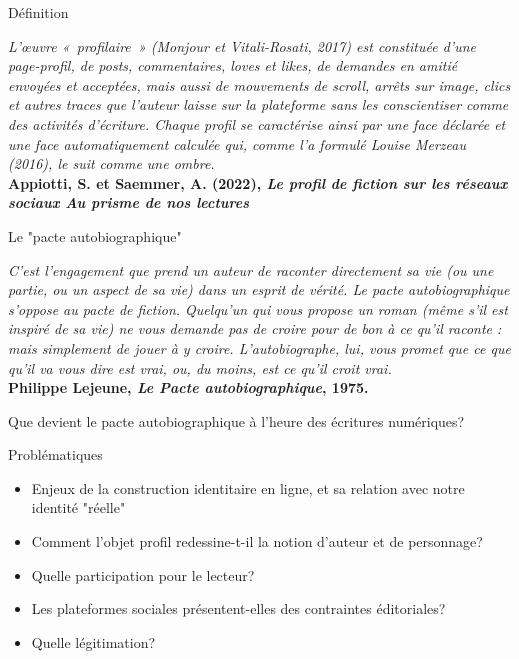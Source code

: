 \begin{frame}{Définition}

    \begin{center}
        {\small  \textit{L’œuvre « profilaire » (Monjour et Vitali-Rosati, 2017) est constituée d’une page-profil, de \textit{posts}, commentaires, \textit{loves} et \textit{likes}, de demandes en amitié envoyées et acceptées, mais aussi de mouvements de \textit{scroll}, arrêts sur image, clics et autres traces que l’auteur laisse sur la plateforme sans les conscientiser comme des activités d’écriture. Chaque profil se caractérise ainsi par une face déclarée et une face automatiquement calculée qui, comme l’a formulé Louise Merzeau (2016), le suit comme une ombre.}}\\
        \textbf{Appiotti, S. et Saemmer, A. (2022), \textit{Le profil de fiction sur les réseaux sociaux Au prisme de nos lectures}}
    \end{center}
\end{frame}

\begin{frame}{Le "pacte autobiographique"}
    \begin{center}
        {\small \textit{C'est l'engagement que prend un auteur de raconter directement sa vie (ou une partie, ou un aspect de sa vie) dans un esprit de vérité. Le pacte autobiographique s'oppose au pacte de fiction. Quelqu'un qui vous propose un roman (même s'il est inspiré de sa vie) ne vous demande pas de croire pour de bon à ce qu'il raconte : mais simplement de jouer à y croire. L'autobiographe, lui, vous promet que ce que qu'il va vous dire est vrai, ou, du moins, est ce qu'il croit vrai.}}\\
        \textbf{Philippe Lejeune, \textit{Le Pacte autobiographique}, 1975.}
    \end{center}
    \textrightarrow{} Que devient le pacte autobiographique à l'heure des écritures numériques?
\end{frame}
\begin{frame}{Problématiques}
    \begin{itemize}
        \item Enjeux de la construction identitaire en ligne, et sa relation avec notre identité "réelle"
        \item Comment l'objet profil redessine-t-il la notion d'auteur et de personnage?
        \item Quelle participation pour le lecteur?
        \item Les plateformes sociales présentent-elles des contraintes éditoriales?
        \item Quelle légitimation?
    \end{itemize}
\end{frame}
